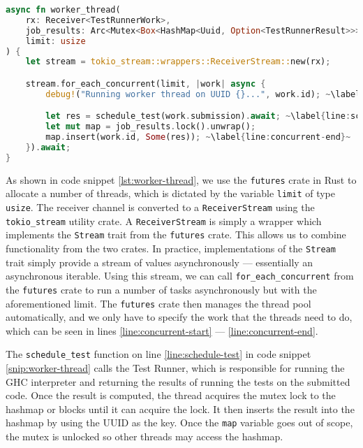\begin{lstlisting}[language=rust, escapechar=~, caption={Rust code showing allocation of thread pools and scheduling of code submission processing}, label={lst:worker-thread}]
async fn worker_thread(
    rx: Receiver<TestRunnerWork>,
    job_results: Arc<Mutex<Box<HashMap<Uuid, Option<TestRunnerResult>>>>>,
    limit: usize
) {
    let stream = tokio_stream::wrappers::ReceiverStream::new(rx);

    stream.for_each_concurrent(limit, |work| async {
        debug!("Running worker thread on UUID {}...", work.id); ~\label{line:concurrent-start}~

        let res = schedule_test(work.submission).await; ~\label{line:schedule-test}~
        let mut map = job_results.lock().unwrap();
        map.insert(work.id, Some(res)); ~\label{line:concurrent-end}~
    }).await;
}
\end{lstlisting}

As shown in code snippet \ref{lst:worker-thread}, we use the \texttt{futures} crate in Rust to allocate a number of threads, which is dictated by the variable \texttt{limit} of type \texttt{usize}.
The receiver channel is converted to a \texttt{ReceiverStream} using the \texttt{tokio\_stream} utility crate.
A \texttt{ReceiverStream} is simply a wrapper which implements the \texttt{Stream} trait from the \texttt{futures} crate.
This allows us to combine functionality from the two crates.
In practice, implementations of the \texttt{Stream} trait simply provide a stream of values asynchronously --- essentially an asynchronous iterable.
Using this stream, we can call \texttt{for\_each\_concurrent} from the \texttt{futures} crate to run a number of tasks asynchronously but with the aforementioned limit.
The \texttt{futures} crate then manages the thread pool automatically, and we only have to specify the work that the threads need to do, which can be seen in lines \ref{line:concurrent-start} --- \ref{line:concurrent-end}.

The \texttt{schedule\_test} function on line \ref{line:schedule-test} in code snippet \ref{snip:worker-thread} calls the Test Runner, which is responsible for running the GHC interpreter and returning the results of running the tests on the submitted code.
Once the result is computed, the thread acquires the mutex lock to the hashmap or blocks until it can acquire the lock.
It then inserts the result into the hashmap by using the UUID as the key.
Once the \texttt{map} variable goes out of scope, the mutex is unlocked so other threads may access the hashmap.


